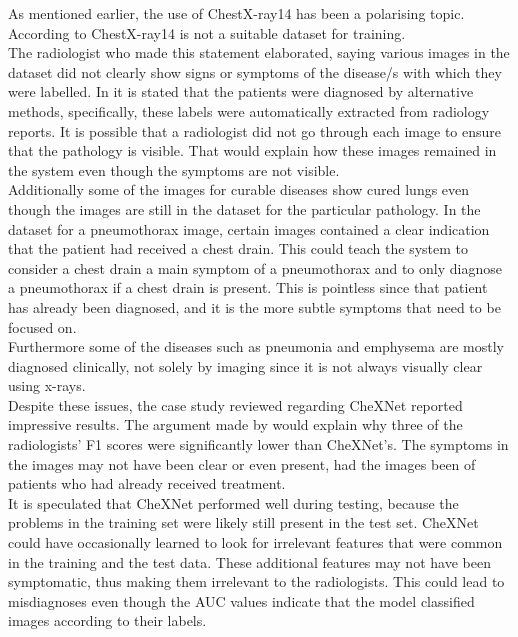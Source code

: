 As mentioned earlier, the use of ChestX-ray14 has been a polarising topic. According to \cite{16} ChestX-ray14 is not a suitable dataset for training. \newline
\\
The radiologist who made this statement elaborated, saying various images in the dataset did not clearly show signs or symptoms of the disease/s with which they were labelled. In \cite{27} it is stated that the patients were diagnosed by alternative methods, specifically, these labels were automatically extracted from radiology reports. It is possible that a radiologist did not go through each image to ensure that the pathology is visible. That would explain how these images remained in the system even though the symptoms are not visible. \newline
\\
Additionally some of the images for curable diseases show cured lungs even though the images are still in the dataset for the particular pathology. In the dataset for a pneumothorax image, certain images contained a clear indication that the patient had received a chest drain. This could teach the system to consider a chest drain a main symptom of a pneumothorax and to only diagnose a pneumothorax if a chest drain is present. This is pointless since that patient has already been diagnosed, and it is the more subtle symptoms that need to be focused on.\newline
\\
Furthermore some of the diseases such as pneumonia and emphysema are mostly diagnosed clinically, not solely by imaging since it is not always visually clear using x-rays. \newline
\\
Despite these issues, the case study reviewed regarding CheXNet reported impressive results. The argument made by \cite{16} would explain why three of the radiologists’ F1 scores were significantly lower than CheXNet’s. The symptoms in the images may not have been clear or even present, had the images been of patients who had already received treatment. \newline
\\
It is speculated that CheXNet performed well during testing, because the problems in the training set were likely still present in the test set. CheXNet could have occasionally learned to look for irrelevant features that were common in the training and the test data. These additional features may not have been symptomatic, thus making them irrelevant to the radiologists. This could lead to misdiagnoses even though the AUC values indicate that the model classified images according to their labels.\newline
